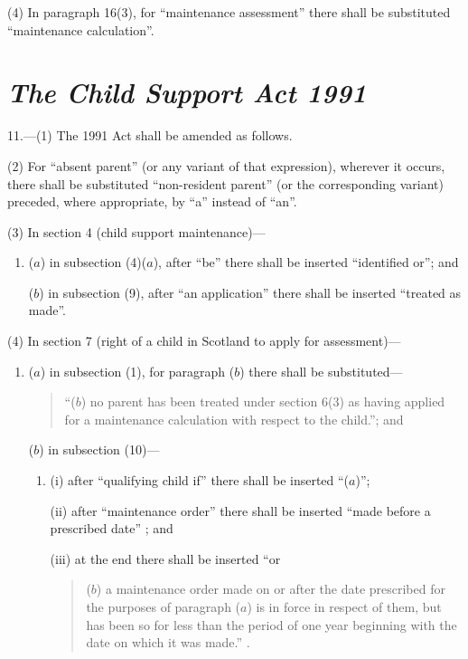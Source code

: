 \documentclass[12pt,a4paper]{article}
\begin{document}
(4) In paragraph 16(3), for “maintenance assessment” there shall be substituted “maintenance calculation”.


\section*{\itshape The Child Support Act 1991}

11.---(1) The 1991 Act shall be amended as follows.

(2) For “absent parent” (or any variant of that expression), wherever it occurs, there shall be substituted “non-resident parent” (or the corresponding variant) preceded, where appropriate, by “a” instead of “an”.

(3) In section 4 (child support maintenance)—
\begin{enumerate}\item[]
($a$) in subsection (4)($a$), after “be” there shall be inserted “identified or”; and

($b$) in subsection (9), after “an application” there shall be inserted “treated as made”.
\end{enumerate}

(4) In section 7 (right of a child in Scotland to apply for assessment)—
\begin{enumerate}\item[]
($a$) in subsection (1), for paragraph ($b$)  there shall be substituted—
\begin{quotation}
“($b$) no parent has been treated under section 6(3)  as having applied for a maintenance calculation with respect to the child.”; and
\end{quotation}

($b$) in subsection (10)—
\begin{enumerate}\item[]
(i) after “qualifying child if” there shall be inserted “($a$)”;

(ii) after “maintenance order” there shall be inserted “made before a prescribed date”%
; and

(iii) at the end there shall be inserted “or
\begin{quotation}
($b$) a maintenance order made on or after the date prescribed for the purposes of paragraph ($a$)  is in force in respect of them, but has been so for less than the period of one year beginning with the date on which it was made.”%
.
\end{quotation}
\end{enumerate}
\end{enumerate}
\end{document}
